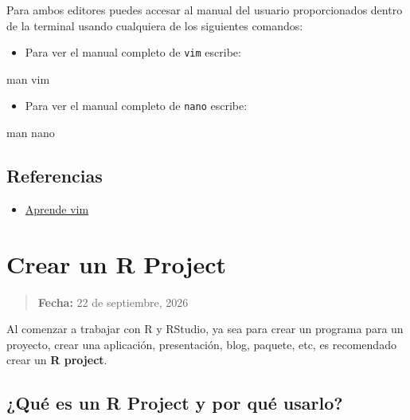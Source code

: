 \documentclass[
  spanish,
  12pt,
  letterpaper,
  DIV=11,
  numbers=noendperiod]{scrreprt}
\newenvironment{Shaded}{\begin{snugshade}}{\end{snugshade}}
\newcommand{\FunctionTok}[1]{\textcolor[rgb]{0.28,0.35,0.67}{#1}}
\newcommand{\NormalTok}[1]{\textcolor[rgb]{0.00,0.23,0.31}{#1}}
\providecommand{\tightlist}{%
  \setlength{\itemsep}{0pt}\setlength{\parskip}{0pt}}
\begin{document}
Para ambos editores puedes accesar al manual del usuario proporcionados
dentro de la terminal usando cualquiera de los siguientes comandos:

\begin{itemize}
\tightlist
\item
  Para ver el manual completo de \texttt{vim} escribe:
\end{itemize}

\begin{Shaded}
\begin{Highlighting}[]
\FunctionTok{man}\NormalTok{ vim}
\end{Highlighting}
\end{Shaded}

\begin{itemize}
\tightlist
\item
  Para ver el manual completo de \texttt{nano} escribe:
\end{itemize}

\begin{Shaded}
\begin{Highlighting}[]
\FunctionTok{man}\NormalTok{ nano}
\end{Highlighting}
\end{Shaded}

\section{Referencias}\label{referencias-5}

\begin{itemize}
\tightlist
\item
  \href{https://victorhck.gitbook.io/aprende-vim}{Aprende vim}
\end{itemize}

\chapter{Crear un R Project}\label{crear-un-r-project}

\begin{quote}
\textbf{Fecha:} 22 de septiembre, 2026
\end{quote}

Al comenzar a trabajar con R y RStudio, ya sea para crear un programa
para un proyecto, crear una aplicación, presentación, blog, paquete,
etc, es recomendado crear un \textbf{R project}.

\section{¿Qué es un R Project y por qué
usarlo?}\label{quuxe9-es-un-r-project-y-por-quuxe9-usarlo}
\end{document}
